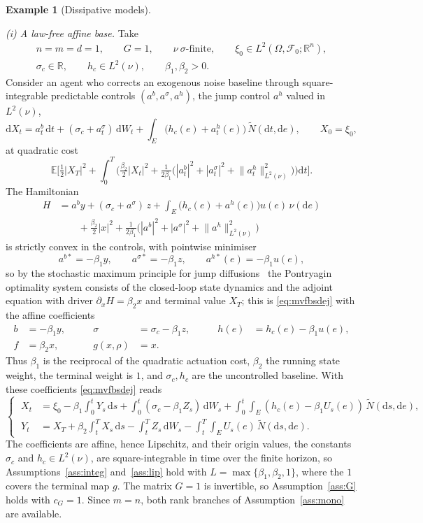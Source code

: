 \documentclass[preprint,12pt]{elsarticle}
\newcommand{\R}{\mathbb{R}}
\newcommand{\E}{\mathbb{E}}
\newcommand{\F}{\mathcal{F}}
\newcommand{\diff}{\mathrm{d}}
\newcommand{\Nt}{\widetilde{N}}
\newcommand{\Lnu}{L^2(\nu)}
\newcommand{\Lnorm}[1]{\lVert #1\rVert_{\Lnu}}
\numberwithin{equation}{section}
\theoremstyle{plain}
\theoremstyle{definition}
\theoremstyle{\PaperRemarkStyle}
\newtheorem{example}[theorem]{Example}
\begin{document}
\begin{example}[Dissipative models]\label{ex:concrete}\leavevmode\par\nopagebreak
\emph{(i) A law-free affine base.} Take
\[
\begin{gathered}
n=m=d=1,\qquad G=1,\qquad \nu\ \sigma\text{-finite},\qquad
\xi_0\in L^2(\Omega,\F_0;\R^n),\\
\sigma_c\in\R,\qquad h_c\in\Lnu,\qquad \beta_1,\beta_2>0 .
\end{gathered}
\]
Consider an agent who corrects an exogenous noise baseline through square-integrable
predictable controls $(a^b,a^\sigma,a^h)$, the jump control $a^h$ valued in $\Lnu$,
\[
\diff X_t=a^b_t\,\diff t+(\sigma_c+a^\sigma_t)\,\diff W_t
+\int_E\bigl(h_c(e)+a^h_t(e)\bigr)\,\Nt(\diff t,\diff e),\qquad X_0=\xi_0,
\]
at quadratic cost
\[
\E\Big[\tfrac12|X_T|^2+\int_0^T\Big(\tfrac{\beta_2}2|X_t|^2
+\tfrac1{2\beta_1}\bigl(|a^b_t|^2+|a^\sigma_t|^2+\Lnorm{a^h_t}^2\bigr)\Big)\diff t\Big].
\]
The Hamiltonian
\[
\begin{aligned}
H&=a^b y+(\sigma_c+a^\sigma)\,z+\int_E\bigl(h_c(e)+a^h(e)\bigr)u(e)\,\nu(\diff e)\\
&\qquad+\tfrac{\beta_2}2|x|^2+\tfrac1{2\beta_1}\bigl(|a^b|^2+|a^\sigma|^2+\Lnorm{a^h}^2\bigr)
\end{aligned}
\]
is strictly convex in the controls, with pointwise minimiser
\[
a^{b*}=-\beta_1 y,\qquad a^{\sigma*}=-\beta_1 z,\qquad a^{h*}(e)=-\beta_1 u(e),
\]
so by the stochastic maximum principle for jump diffusions~\cite{TangLi} the Pontryagin
optimality system consists of the closed-loop state dynamics and the adjoint equation
with driver $\partial_xH=\beta_2x$ and terminal value $X_T$; this is
\eqref{eq:mvfbsdej} with the affine coefficients
\[
\begin{aligned}
b&=-\beta_1 y, &\qquad \sigma&=\sigma_c-\beta_1 z, &\qquad h(e)&=h_c(e)-\beta_1 u(e),\\
f&=\beta_2 x, &\qquad g(x,\rho)&=x .
\end{aligned}
\]
Thus $\beta_1$ is the reciprocal of the quadratic actuation cost, $\beta_2$ the running
state weight, the terminal weight is $1$, and $\sigma_c,h_c$ are the uncontrolled baseline.
With these coefficients \eqref{eq:mvfbsdej} reads
\[
\left\{\;\begin{aligned}
X_t&=\xi_0-\beta_1\!\int_0^t\! Y_s\,\diff s+\int_0^t\!(\sigma_c-\beta_1 Z_s)\,\diff W_s
+\int_0^t\!\!\int_E(h_c(e)-\beta_1 U_s(e))\,\Nt(\diff s,\diff e),\\
Y_t&=X_T+\beta_2\!\int_t^T\! X_s\,\diff s-\int_t^T\! Z_s\,\diff W_s
-\int_t^T\!\!\int_E U_s(e)\,\Nt(\diff s,\diff e).
\end{aligned}\right.
\]
The coefficients are affine, hence Lipschitz, and their origin values, the constants
$\sigma_c$ and $h_c\in\Lnu$, are square-integrable in time over the finite horizon, so
Assumptions~\ref{ass:integ} and~\ref{ass:lip} hold with
$L=\max\{\beta_1,\beta_2,1\}$, where the $1$ covers the terminal map $g$. The matrix $G=1$ is
invertible, so Assumption~\ref{ass:G} holds with $c_G=1$. Since $m=n$,
both rank branches of Assumption~\ref{ass:mono} are available.


\end{example}
\end{document}
